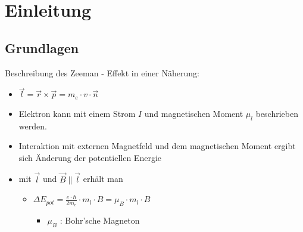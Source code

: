 
\section{Einleitung}
    \subsection{Grundlagen}
        \begin{myframe}{\subsecname}
            Beschreibung des Zeeman - Effekt in einer Näherung:
            \begin{itemize}
                \item $\vec{l} = \vec{r} \times \vec{p} = m_e \cdot v \cdot \vec{n}$
                \item Elektron kann mit einem Strom $ I $ und magnetischen Moment $\mu_{l}$ beschrieben werden.
                \item Interaktion mit externen Magnetfeld und dem magnetischen Moment ergibt sich Änderung der potentiellen Energie
                \item mit $\vec{l}$ und $\vec{B} \parallel \vec{l}$ erhält man
                \begin{itemize}
                    \item[] $\Delta E_{pot} = \frac{e \cdot \hbar}{2m_e} \cdot m_l \cdot B = \mu_B \cdot m_l \cdot B $
                    \begin{itemize}
                        \item[] $\mu_{B}$ : Bohr'sche Magneton
                    \end{itemize}
                \end{itemize}
            \end{itemize}
        \end{myframe}

